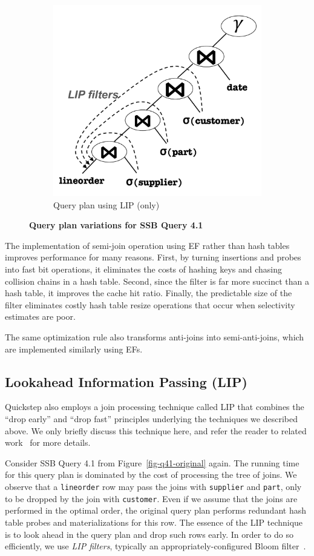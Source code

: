 \begin{figure}[t]
\begin{subfigure}[bt]{0.3\textwidth}
		\centering
		\includegraphics[width=1.0\textwidth,
		height=0.75\textwidth]{system/figures/Q41-LIP.pdf}
		\caption{Query plan using LIP (only)}
		\label{fig-q41-lip}
	\end{subfigure} %
	\caption{\textbf{Query plan variations for SSB Query 4.1}}
\end{figure}

The implementation of semi-join operation using EF rather than hash tables improves performance for many reasons. First, by turning insertions and probes into fast bit operations, it eliminates the costs of hashing keys and chasing collision chains in a hash table. Second, since the filter is far more succinct than a hash table, it improves the cache hit ratio. Finally, the predictable size of the filter eliminates costly hash table resize operations that occur when selectivity estimates are poor.

The same optimization rule also transforms anti-joins into semi-anti-joins, which are implemented similarly using EFs.

\subsection{Lookahead Information Passing (LIP)} \label{sec:lip}
Quickstep also employs a join processing technique called LIP that combines the ``drop early'' and ``drop fast'' principles underlying the techniques we described above. We only briefly discuss this technique here, and refer the reader to related work~\cite{DBLP:journals/pvldb/ZhuPSP17} for more details.

Consider SSB Query 4.1 from Figure~\ref{fig-q41-original} again. The running time for this query plan is dominated by the cost of processing the tree of joins. We observe that a \texttt{lineorder} row may pass the joins with \texttt{supplier} and \texttt{part}, only to be dropped by the join with \texttt{customer}. Even if we assume that the joins are performed in the optimal order, the original query plan performs redundant hash table probes and materializations for this row. The essence of the LIP technique is to look ahead in the query plan and drop such rows early. In order to do so efficiently, we use \emph{LIP filters}, typically an appropriately-configured Bloom filter~\cite{Bloom70Space}.

